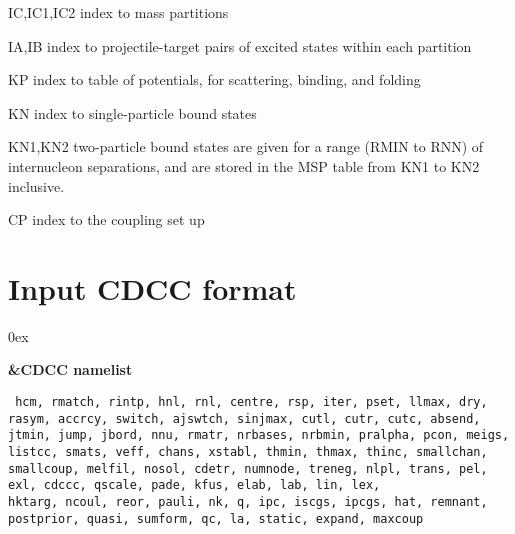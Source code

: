 \documentclass[11pt]{article}
\begin{document}
IC,IC1,IC2    index to mass partitions

IA,IB         index to projectile-target pairs of excited states
              within each partition

KP            index to table of potentials, for scattering, binding,
              and folding

KN            index to single-particle bound states

KN1,KN2       two-particle bound states are given for a range (RMIN to
              RNN) of internucleon separations, and are stored in the
              MSP table from KN1 to KN2 inclusive.

CP            index to the coupling set up

\newpage
\section{Input CDCC format}
\hangindent 0ex

{\bf \&CDCC namelist}

{\tt
hcm, rmatch, rintp, hnl, rnl, centre,  rsp, iter, pset, llmax,  dry,
rasym, accrcy, switch, ajswtch, sinjmax,  cutl, cutr, cutc,
absend, jtmin, jump, jbord, nnu,  rmatr, nrbases, nrbmin,  pralpha, pcon,  meigs,
listcc, smats, veff, chans, xstabl, thmin, thmax, thinc,
smallchan, smallcoup, melfil, nosol, cdetr, numnode, treneg,
nlpl, trans, pel, exl, cdccc, qscale, pade, kfus,
elab,  lab, lin, lex, \\
hktarg, ncoul, reor, pauli,  nk,
q, ipc, iscgs, ipcgs,  hat, remnant, postprior, quasi,
sumform, qc, la, static, expand, maxcoup
}\\
\end{document}
